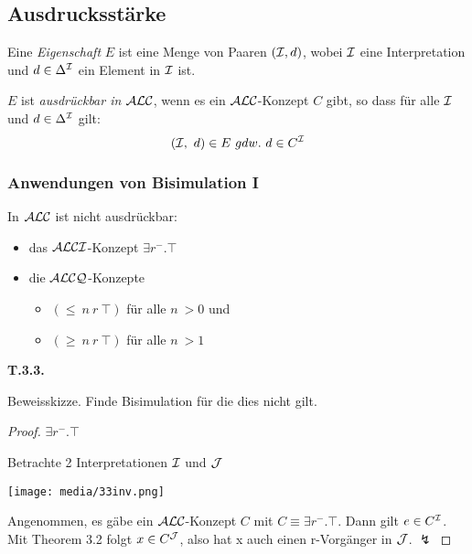 \subsection{Ausdrucksstärke}\label{ausdrucksstuxe4rke}

\begin{definition}

Eine \emph{Eigenschaft} $E$ ist eine Menge von Paaren $(\mathcal{I},d)$, wobei
$\mathcal{I}$ eine Interpretation und $d \in \Delta^{\mathcal{I}}$ ein Element in $\mathcal{I}$ ist.

$E$ ist \emph{ausdrückbar in $\mathcal{A}\mathcal{L}\mathcal{C}$}, wenn es ein $\mathcal{A}\mathcal{L}\mathcal{C}$-Konzept $C$
gibt, so dass für alle $\mathcal{I}$ und $d \in \Delta^{\mathcal{I}}$ gilt:
$$\left( \mathcal{I},\ d \right) \in E\ gdw.\ d \in C^{\mathcal{I}}$$
\end{definition}

\subsubsection{Anwendungen von Bisimulation I}\label{theorem-3.4}

\begin{theorem}
In $\mathcal{A}\mathcal{L}\mathcal{C}$ ist nicht ausdrückbar: 
\begin{itemize}
\item das $\mathcal{A}\mathcal{L}\mathcal{C}\mathcal{I}$-Konzept $\exists r^{-}.\top$ 
\item die $\mathcal{A}\mathcal{L}\mathcal{C}\mathcal{Q}$-Konzepte
\begin{itemize}
  \item $(\leq\ n\ r\ \top)$ für alle $n\ > 0$ und
  \item $(\geq\ n\ r\ \top)$ für alle $n\ > 1$
\end{itemize}
\end{itemize}
\end{theorem}

\textbf{T.3.3.}

Beweisskizze. Finde Bisimulation für die dies nicht gilt.

\begin{proof}
\textbf{$\exists r^{-}.\top$}

Betrachte 2 Interpretationen $\mathcal{I}$ und $\mathcal{J}$

\texttt{[image: media/33inv.png]}

Angenommen, es gäbe ein $\mathcal{A}\mathcal{L}\mathcal{C}$-Konzept $C$ mit $C \equiv \exists r^{-}.\top$. Dann gilt $e \in C^{\mathcal{I}}$. Mit Theorem 3.2 folgt $x \in C^{\mathcal{J}}$, also hat x auch einen r-Vorgänger in $\mathcal{J}$. $\lightning$
\end{proof} 


